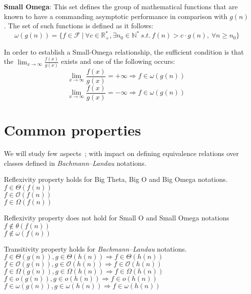 \begin{definition}   
 \textbf{Small Omega}:
  This set defines the group of mathematical functions that are known to have a commanding asymptotic performance in comparison with  $g(n)$.
  The set of such functions is defined as it follows:
  \[\omega(g(n)) = \lbrace f \in \mathcal{F}\ |\ \forall c \in \mathbb{R}^{*}_{+}, \exists n_{0} \in \mathbb{N}^{*}\ s.t.\  f(n) > c \cdot g(n),\  \forall n \geq n_{0} \rbrace\]
  \end{definition}  
  \begin{lemma}
In order to establish a Small-Omega relationship, the sufficient condition is that the $ \lim_{x\to\infty} \frac{f(x)}{g(x)}$ exists and one of the following occurs:
  \[  \lim_{x\to\infty} \frac{f(x)}{g(x)} = +\infty \Rightarrow f \in \omega(g(n))\ \]   
  \[  \lim_{x\to\infty} \frac{f(x)}{g(x)} = -\infty \Rightarrow f \in \omega(g(n))\ \]  
  \end{lemma}

\section{Common properties}
We will study few aspects~\cite{mogocs2015new};
 with impact on defining equivalence relations over classes defined in \textit{Bachmann–Landau} notations.
 \hfill\break
 \begin{theorem} Reflexivity property holds for Big Theta, Big O and Big Omega notations.  \\  $ f \in \Theta(f(n)) $ \\$ f \in \mathcal{O}(f(n)) $ \\$ f \in \Omega(f(n)) $
 \end{theorem}

\begin{theorem} Reflexivity property does not hold for Small O and Small Omega notations \\
 $ f \notin \theta(f(n)) $ \\$ f \notin \omega(f(n)) $ 
\end{theorem}

\begin{theorem} Transitivity property holds for \textit{Bachmann–Landau} notations.  \\  $ f \in \Theta(g(n)),  g \in \Theta(h(n)) \Rightarrow  f \in \Theta(h(n))$ \\
 $ f \in \mathcal{O}(g(n)),  g \in \mathcal{O}(h(n)) \Rightarrow  f \in \mathcal{O}(h(n))$ \\
 $ f \in \Omega(g(n)),  g \in \Omega(h(n)) \Rightarrow  f \in \Omega(h(n))$ \\
 $ f \in o(g(n)),  g \in o(h(n)) \Rightarrow  f \in o(h(n))$ \\
 $ f \in \omega(g(n)),  g \in \omega(h(n)) \Rightarrow  f \in \omega(h(n))$
\end{theorem} 

